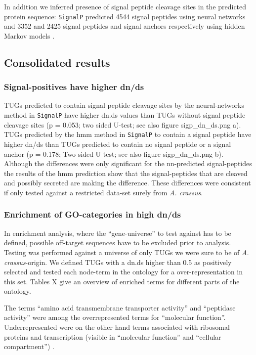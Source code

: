 \documentclass[10pt]{bmc_article}
\newenvironment{bmcformat}{\begin{raggedright}\baselineskip20pt\sloppy\setboolean{publ}{false}}{\end{raggedright}\baselineskip20pt\sloppy}
\begin{document}
\begin{bmcformat}
In addition we inferred presence of signal peptide cleavage sites in
the predicted protein sequence: \texttt{SignalP} \cite{pmid17446895}
predicted 4544 signal peptides using neural networks and
3352 and 2425 signal peptides and signal anchors
respectively using hidden Markov models \cite{pmid9783217}.

\subsection*{Consolidated results}





\subsubsection*{Signal-positives have higher dn/ds}

TUGs predicted to contain signal peptide cleavage sites by the
neural-networks method in \texttt{SignalP} have higher dn.ds values
than TUGs without signal peptide cleavage sites (p =
0.053; two sided U-test; see also
figure sigp\_dn\_ds.png a). TUGs predicted by the hmm method in
\texttt{SignalP} to contain a signal peptide have higher dn/ds than
TUGs predicted to contain no signal peptide or a signal anchor (p =
0.178; Two sided U-test; see also
figure sigp\_dn\_ds.png b). Although the differences were only
significant for the nn-predicted signal-peptides the results of the
hmm prediction show that the signal-peptides that are cleaved and
possibly secreted are making the difference. These differences were
consistent if only tested against a restricted data-set surely from
\textit{A. crassus}.

\subsubsection*{Enrichment of GO-categories in high dn/ds}

In enrichment analysis, where the ``gene-universe'' to test against
has to be defined, possible off-target sequences have to be excluded
prior to analysis. Testing was performed against a universe of only
TUGs we were sure to be of \textit{A. crassus}-origin. We defined TUGs
with a dn.ds higher than 0.5 as positively selected and tested each
node-term in the ontology for a over-representation in this set. Tables
X give an overview of enriched terms for different parts of the
ontology.

The terms ``amino acid transmembrane transporter activity'' and
``peptidase activity'' were among the overrepresented terms for
``molecular function''. Underrepresented were on the other hand terms
associated with ribosomal proteins and transcription (visible in
``molecular function'' and ``cellular compartment'') .


\end{bmcformat}
\end{document}
